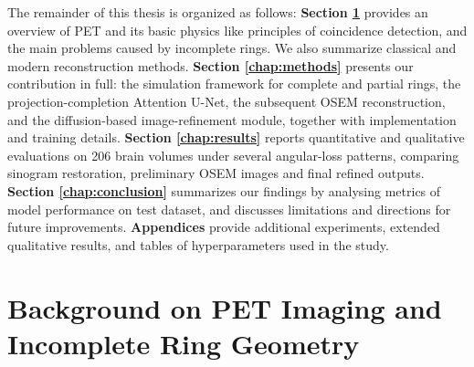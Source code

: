 \documentclass[12pt]{iopart}
\begin{document}
The remainder of this thesis is organized as follows:
\textbf{Section \ref{chap:background}} provides an overview of PET and its basic physics like principles of coincidence detection, and the main problems caused by incomplete rings. We also summarize classical and modern reconstruction methods.
\textbf{Section \ref{chap:methods}} presents our contribution in full: the simulation framework for complete and partial rings, the projection-completion Attention U-Net, the subsequent OSEM reconstruction, and the diffusion-based image-refinement module, together with implementation and training details.
\textbf{Section \ref{chap:results}} reports quantitative and qualitative evaluations on 206 brain volumes under several angular-loss patterns, comparing sinogram restoration, preliminary OSEM images and final refined outputs.
\textbf{Section \ref{chap:conclusion}} summarizes our findings by analysing metrics of model performance on test dataset, and discusses limitations and directions for future improvements.
\textbf{Appendices} provide additional experiments, extended qualitative results, and tables of hyperparameters used in the study.




\section{Background on PET Imaging and Incomplete Ring Geometry}

\label{chap:background}





\end{document}
